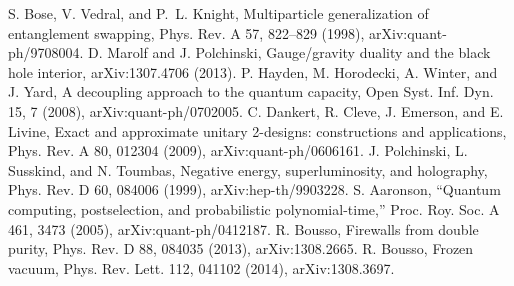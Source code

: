 \documentclass[11pt]{article}
\begin{document}
\begin{thebibliography}{99}
 S. Bose, V. Vedral, and P.~L. Knight, Multiparticle generalization of entanglement swapping, Phys. Rev. A 57, 822--829 (1998), arXiv:quant-ph/9708004.
 D. Marolf and J. Polchinski, Gauge/gravity duality and the black hole interior, arXiv:1307.4706 (2013).
 P. Hayden, M. Horodecki, A. Winter, and J. Yard, A decoupling approach to the quantum capacity, Open Syst. Inf. Dyn. 15, 7 (2008), arXiv:quant-ph/0702005.
 C. Dankert, R. Cleve, J. Emerson, and E. Livine, Exact and approximate unitary 2-designs: constructions and applications, Phys. Rev. A 80, 012304 (2009), arXiv:quant-ph/0606161.
 J. Polchinski, L. Susskind, and N. Toumbas, Negative energy, superluminosity, and holography, Phys. Rev. D 60, 084006 (1999), arXiv:hep-th/9903228.
 S. Aaronson, ``Quantum computing, postselection, and probabilistic polynomial-time,'' Proc. Roy. Soc. A 461, 3473 (2005), arXiv:quant-ph/0412187.
 R. Bousso, Firewalls from double purity, Phys. Rev. D 88, 084035 (2013), arXiv:1308.2665.
 R. Bousso, Frozen vacuum, Phys. Rev. Lett. 112, 041102 (2014), arXiv:1308.3697.

\end{thebibliography}
\end{document}
